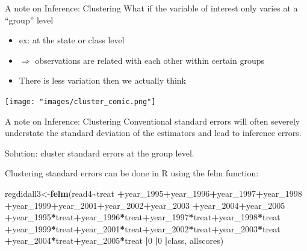 \documentclass[
  ignorenonframetext,
]{beamer}
\newenvironment{Shaded}{\begin{snugshade}}{\end{snugshade}}
\newcommand{\DecValTok}[1]{\textcolor[rgb]{0.00,0.00,0.81}{#1}}
\newcommand{\FunctionTok}[1]{\textcolor[rgb]{0.13,0.29,0.53}{\textbf{#1}}}
\newcommand{\NormalTok}[1]{#1}
\newcommand{\OtherTok}[1]{\textcolor[rgb]{0.56,0.35,0.01}{#1}}
\newcommand{\SpecialCharTok}[1]{\textcolor[rgb]{0.81,0.36,0.00}{\textbf{#1}}}
\begin{document}
\begin{frame}{A note on Inference: Clustering}
\protect\hypertarget{a-note-on-inference-clustering}{}
What if the variable of interest only varies at a ``group'' level

\begin{itemize}
\item
  ex: at the state or class level
\item
  \(\Rightarrow\) observations are related with each other within
  certain groups
\item
  There is less variation then we actually think
\end{itemize}

\texttt{[image: "images/cluster\_comic.png"]}
\end{frame}

\begin{frame}[fragile]{A note on Inference: Clustering}
\protect\hypertarget{a-note-on-inference-clustering-1}{}
Conventional standard errors will often severely understate the standard
deviation of the estimators and lead to inference errors.

Solution: cluster standard errors at the group level.

Clustering standard errors can be done in R using the felm function:
\tiny

\begin{Shaded}
\begin{Highlighting}[]
\NormalTok{regdidall3}\OtherTok{\textless{}{-}}\FunctionTok{felm}\NormalTok{(read4}\SpecialCharTok{\textasciitilde{}}\NormalTok{treat}
                 \SpecialCharTok{+}\NormalTok{year\_1995}\SpecialCharTok{+}\NormalTok{year\_1996}\SpecialCharTok{+}\NormalTok{year\_1997}\SpecialCharTok{+}\NormalTok{year\_1998}
                 \SpecialCharTok{+}\NormalTok{year\_1999}\SpecialCharTok{+}\NormalTok{year\_2001}\SpecialCharTok{+}\NormalTok{year\_2002}\SpecialCharTok{+}\NormalTok{year\_2003}
                 \SpecialCharTok{+}\NormalTok{year\_2004}\SpecialCharTok{+}\NormalTok{year\_2005}
                 \SpecialCharTok{+}\NormalTok{year\_1995}\SpecialCharTok{*}\NormalTok{treat}\SpecialCharTok{+}\NormalTok{year\_1996}\SpecialCharTok{*}\NormalTok{treat}\SpecialCharTok{+}\NormalTok{year\_1997}\SpecialCharTok{*}\NormalTok{treat}\SpecialCharTok{+}\NormalTok{year\_1998}\SpecialCharTok{*}\NormalTok{treat}
                 \SpecialCharTok{+}\NormalTok{year\_1999}\SpecialCharTok{*}\NormalTok{treat}\SpecialCharTok{+}\NormalTok{year\_2001}\SpecialCharTok{*}\NormalTok{treat}\SpecialCharTok{+}\NormalTok{year\_2002}\SpecialCharTok{*}\NormalTok{treat}\SpecialCharTok{+}\NormalTok{year\_2003}\SpecialCharTok{*}\NormalTok{treat}
                 \SpecialCharTok{+}\NormalTok{year\_2004}\SpecialCharTok{*}\NormalTok{treat}\SpecialCharTok{+}\NormalTok{year\_2005}\SpecialCharTok{*}\NormalTok{treat}
                 \SpecialCharTok{|}\DecValTok{0}
                 \SpecialCharTok{|}\DecValTok{0}
                 \SpecialCharTok{|}\NormalTok{class,}
\NormalTok{                 allscores)}
\end{Highlighting}
\end{Shaded}
\end{frame}
\end{document}

